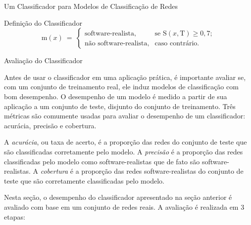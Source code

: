 \begin{section}{Um Classificador para Modelos de Classificação de Redes}
\begin{subsection}{Definição do Classificador}
$$
\mathrm{m}(x) ~=~
\left\{
\begin{array}{cl}
\mbox{software-realista,} & \mbox{se } \mathrm{S}(x, \mbox{T}) \ge 0,7; \\
\mbox{não software-realista,} & \mbox{caso contrário.}
\end{array}
\right.
$$



\end{subsection}
\end{section}

\begin{section}{Avaliação do Classificador} \label{cap:clas3}

	Antes de usar o classificador em uma aplicação prática, é importante avaliar se, com um conjunto de treinamento real, ele induz modelos de classificação com bom desempenho. O desempenho de um modelo é medido a partir de sua aplicação a um conjunto de teste, disjunto do conjunto de treinamento. Três métricas são comumente usadas para avaliar o desempenho de um classificador: acurácia, precisão e cobertura.

	A \emph{acurácia}, ou taxa de acerto, é a proporção das redes do conjunto de teste que são classificadas corretamente pelo modelo. A \emph{precisão} é a proporção das redes classificadas pelo modelo como software-realistas que de fato são software-realistas. A \emph{cobertura} é a proporção das redes software-realistas do conjunto de teste que são corretamente classificadas pelo modelo.
	
	Nesta seção, o desempenho do classificador apresentado na seção anterior é avaliado com base em um conjunto de redes reais. A avaliação é realizada em 3 etapas: 
	

\end{section}
